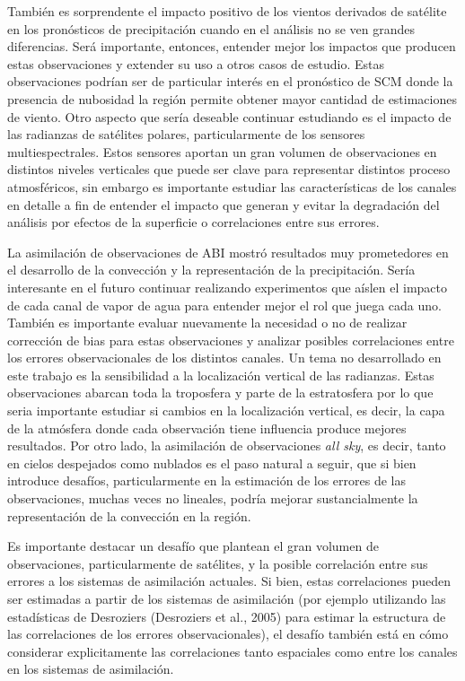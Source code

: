\documentclass[12pt,oneside,a4paper]{reedthesis}
\begin{document}
También es sorprendente el impacto positivo de los vientos derivados de satélite en los pronósticos de precipitación cuando en el análisis no se ven grandes diferencias. Será importante, entonces, entender mejor los impactos que producen estas observaciones y extender su uso a otros casos de estudio. Estas observaciones podrían ser de particular interés en el pronóstico de SCM donde la presencia de nubosidad la región permite obtener mayor cantidad de estimaciones de viento. Otro aspecto que sería deseable continuar estudiando es el impacto de las radianzas de satélites polares, particularmente de los sensores multiespectrales. Estos sensores aportan un gran volumen de observaciones en distintos niveles verticales que puede ser clave para representar distintos proceso atmosféricos, sin embargo es importante estudiar las características de los canales en detalle a fin de entender el impacto que generan y evitar la degradación del análisis por efectos de la superficie o correlaciones entre sus errores.

La asimilación de observaciones de ABI mostró resultados muy prometedores en el desarrollo de la convección y la representación de la precipitación. Sería interesante en el futuro continuar realizando experimentos que aíslen el impacto de cada canal de vapor de agua para entender mejor el rol que juega cada uno. También es importante evaluar nuevamente la necesidad o no de realizar corrección de bias para estas observaciones y analizar posibles correlaciones entre los errores observacionales de los distintos canales. Un tema no desarrollado en este trabajo es la sensibilidad a la localización vertical de las radianzas. Estas observaciones abarcan toda la troposfera y parte de la estratosfera por lo que seria importante estudiar si cambios en la localización vertical, es decir, la capa de la atmósfera donde cada observación tiene influencia produce mejores resultados. Por otro lado, la asimilación de observaciones \emph{all sky}, es decir, tanto en cielos despejados como nublados es el paso natural a seguir, que si bien introduce desafíos, particularmente en la estimación de los errores de las observaciones, muchas veces no lineales, podría mejorar sustancialmente la representación de la convección en la región.

Es importante destacar un desafío que plantean el gran volumen de observaciones, particularmente de satélites, y la posible correlación entre sus errores a los sistemas de asimilación actuales. Si bien, estas correlaciones pueden ser estimadas a partir de los sistemas de asimilación (por ejemplo utilizando las estadísticas de Desroziers (Desroziers et al., 2005) para estimar la estructura de las correlaciones de los errores observacionales), el desafío también está en cómo considerar explicitamente las correlaciones tanto espaciales como entre los canales en los sistemas de asimilación.
\end{document}
